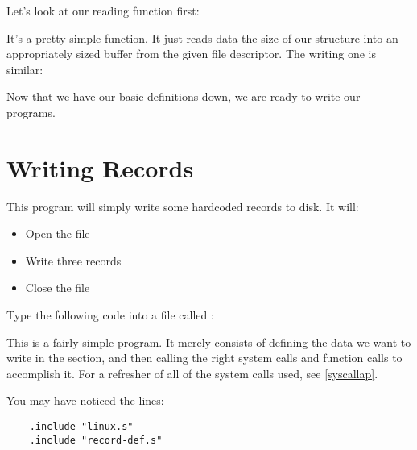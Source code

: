 Let's look at our reading function first:

\begin{simpletyping}

\end{simpletyping}

It's a pretty simple function.  It just reads data the size of our structure
into an appropriately sized buffer from the given file descriptor.  The 
writing one is similar:

\begin{simpletyping}

\end{simpletyping}

Now that we have our basic definitions down, we are ready to write
our programs.

\section{Writing Records}

This program will simply write some hardcoded records to disk.
It will:

\begin{itemize}\item Open the file 
\item Write three records 
\item Close the file 
\end{itemize}

Type the following code into a file called :

\begin{simpletyping}

\end{simpletyping}


This is a fairly simple program.  It merely consists of defining
the data we want to write in the  section,
and then calling the right system calls and function calls to
accomplish it.  For a refresher of all of the system calls used,
see \autoref{syscallap}.

You may have noticed the lines:

\begin{simpletyping}
\begin{lstlisting}
	.include "linux.s"
	.include "record-def.s"
\end{lstlisting}
\end{simpletyping}

